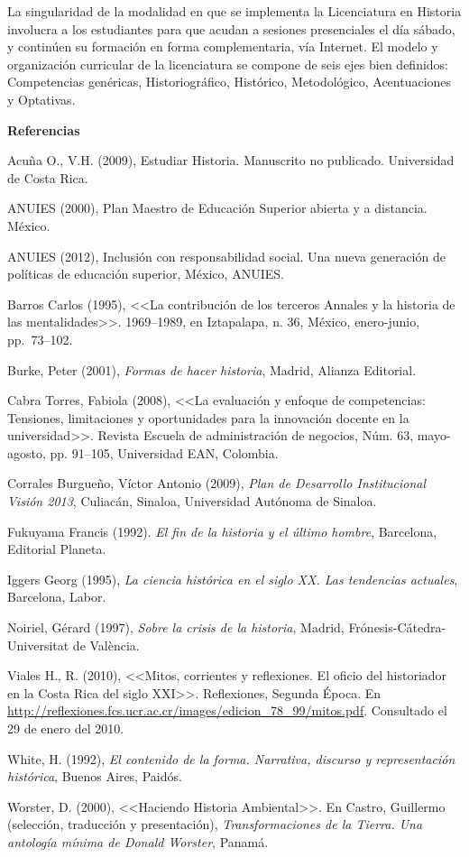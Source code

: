 La singularidad de la modalidad en que se implementa la Licenciatura en
Historia involucra a los estudiantes para que acudan a sesiones
presenciales el día sábado, y continúen su formación en forma
complementaria, vía Internet. El modelo y organización curricular de la
licenciatura se compone de seis ejes bien definidos: Competencias
genéricas, Historiográfico, Histórico, Metodológico, Acentuaciones y
Optativas. 

\medskip
\textbf{Referencias}

Acuña O., V.H. (2009), Estudiar Historia. Manuscrito no publicado.
Universidad de Costa Rica.

ANUIES (2000), Plan Maestro de Educación Superior abierta y a distancia.
México.

ANUIES (2012), Inclusión con responsabilidad social. Una nueva generación de
políticas de educación superior, México, ANUIES.

Barros  Carlos (1995), <<La contribución de los terceros Annales y la
historia de las mentalidades>>. 1969--1989,  en Iztapalapa, n. 36, México,
enero-junio, pp.\ 73--102.

Burke, Peter (2001), \textit{Formas de hacer historia}, Madrid, Alianza
Editorial.

Cabra Torres, Fabiola (2008), <<La evaluación y enfoque de competencias:
Tensiones, limitaciones y  oportunidades para la innovación docente en la
universidad>>. Revista Escuela de administración de negocios, Núm. 63,
mayo-agosto, pp. 91--105, Universidad EAN, Colombia.

Corrales Burgueño, Víctor Antonio (2009), \textit{Plan de Desarrollo
Institucional Visión 2013}, Culiacán, Sinaloa, Universidad Autónoma de
Sinaloa.

Fukuyama  Francis (1992).  \textit{El fin de la historia y el último hombre}, Barcelona, Editorial Planeta.

Iggers  Georg (1995),  \textit{La ciencia histórica en el siglo XX. Las tendencias
actuales}, Barcelona, Labor.

Noiriel, Gérard (1997), \textit{Sobre la crisis de la historia}, Madrid,
Frónesis-Cátedra-Universitat de València.

\begin{sloppypar}
Viales H., R. (2010), <<Mitos, corrientes y reflexiones. El oficio del
historiador en la Costa Rica del siglo XXI>>. Reflexiones, Segunda Época. En
\url{http://reflexiones.fcs.ucr.ac.cr/images/edicion_78_99/mitos.pdf}. Consultado el 29
de enero del 2010. 
\end{sloppypar}

White, H. (1992), \textit{El contenido de la forma. Narrativa,
discurso y representación histórica}, Buenos Aires, Paidós.


Worster, D. (2000), <<Haciendo Historia Ambiental>>. En Castro, Guillermo
(selección, traducción y presentación), \textit{Transformaciones de la Tierra. Una
antología mínima de Donald Worster}, Panamá.